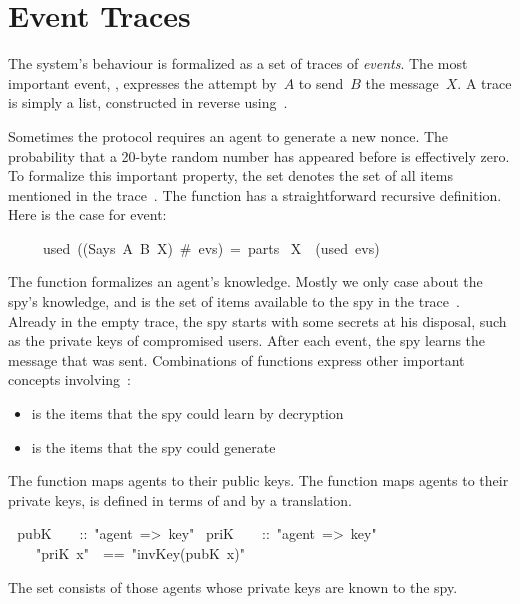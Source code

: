 \section{Event Traces}\label{sec:events}

The system's behaviour is formalized as a set of traces of
\emph{events}.  The most important event, , expresses the
attempt by~$A$ to send~$B$ the
  message~$X$.  A trace is simply a list, constructed in reverse
using~\isa{\#}.  

Sometimes the protocol requires an agent to generate a new nonce. The
probability that a 20-byte random number has appeared before is effectively
zero.  To formalize this important property, the set 
denotes the set of all items mentioned in the trace~.
The function  has a straightforward
recursive definition.  Here is the case for  event:
\begin{isabelle}
\ \ \ \ \ used\ ((Says\ A\ B\ X)\ \#\ evs)\ =\ parts\ \isacharbraceleft
X\isacharbraceright \ \isasymunion\ (used\ evs)
\end{isabelle}

The function  formalizes an agent's knowledge.  Mostly we only
case about the spy's knowledge, and  is the set of items
available to the spy in the trace~.  Already in the empty trace,
the spy starts with some secrets at his disposal, such as the private keys
of compromised users.  After each  event, the spy learns the
message that was sent.  Combinations of functions express other important
concepts involving~:
\begin{itemize}
\item {} is the items that the spy could
learn by decryption
\item {} is the items that the spy
could generate
\end{itemize}

The function
 maps agents to their public keys.  The function
 maps agents to their private keys, is defined in terms of
 and  by a translation.
\begin{isabelle}
\ \,pubK\ \ \ \ ::\ "agent\ =>\ key"\isanewline
{}\ priK\ \ \ \ ::\ "agent\ =>\ key"\isanewline
{}\ \ \ \ "priK\ x"\ \ ==\ "invKey(pubK\ x)"
\end{isabelle}
The set  consists of those agents whose private keys are known to
the spy.

